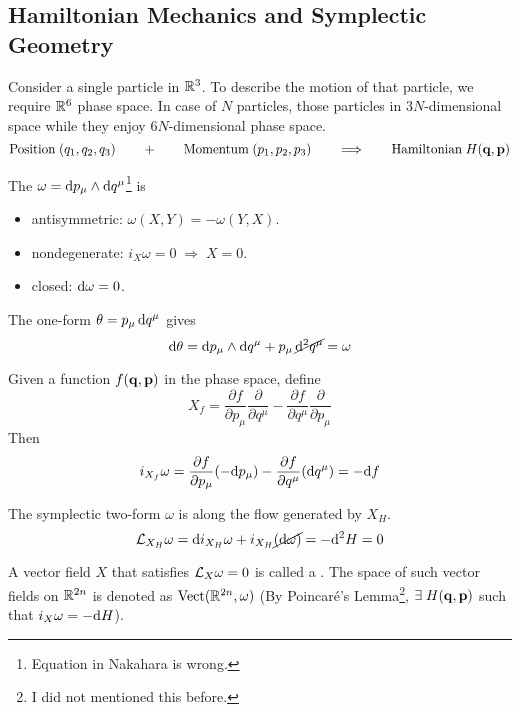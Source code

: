 \documentclass[a4paper, 10pt]{article}
\begin{document}
\subsection{Hamiltonian Mechanics and Symplectic Geometry}

Consider a single particle in $\mathbb{R}^{3}$. To describe the motion of that particle, we require $\mathbb{R}^{6}$ phase space. In case of $N$ particles, those particles  in $3N$-dimensional space while they enjoy $6N$-dimensional phase space. 
\[ \text{Position} \; (q_{1}, q_{2}, q_{3}) \qquad + \qquad \text{Momentum} \; (p_{1}, p_{2}, p_{3}) \qquad \Longrightarrow \qquad \text{Hamiltonian} \; H(\mathbf{q}, \mathbf{p}) \]
\begin{definition}
    The  $\omega = \mathrm{d}{p}_{\mu} \wedge \mathrm{d}{q}^{\mu}$\footnote{Equation in Nakahara is wrong.} is
    \begin{itemize}
        \item antisymmetric: $\omega(X,Y) = -\omega(Y,X)$.
        \item nondegenerate: $i_{X}\omega = 0 \; \Longrightarrow \; X = 0$.
        \item closed: $\mathrm{d}\omega = 0$.
    \end{itemize}
\end{definition}
\begin{remark}
    The one-form $\theta = p_{\mu}\,\mathrm{d}{q}^{\mu}$ gives
    \[ \mathrm{d}\theta = \mathrm{d}{p}_{\mu} \wedge \mathrm{d}{q}^{\mu} + p_{\mu}\,\cancel{\mathrm{d}^{2}q^{\mu}} = \omega \]
\end{remark}
\newpage


\begin{definition}
    Given a function $f(\mathbf{q}, \mathbf{p})$ in the phase space, define
    \[ X_{f} = \frac{\partial{f}}{\partial{p}_{\mu}}\frac{\partial}{\partial{q}^{\mu}} - \frac{\partial{f}}{\partial{q}^{\mu}}\frac{\partial}{\partial{p}_{\mu}} \]
    Then
    \[ i_{X_{f}}\omega = \frac{\partial{f}}{\partial{p}_{\mu}}(-\mathrm{d}{p}_{\mu}) - \frac{\partial{f}}{\partial{q}^{\mu}}(\mathrm{d}{q}^{\mu}) = -\mathrm{d}{f} \]
\end{definition}
\begin{remark}
    The symplectic two-form $\omega$ is  along the flow generated by $X_{H}$.
    \[ \mathcal{L}_{X_{H}}\omega = \mathrm{d} i_{X_{H}}\omega + i_{X_{H}}\cancel{(\mathrm{d}\omega)} = -\mathrm{d}^{2}H = 0 \]
\end{remark}
\begin{remark}
    A vector field $X$ that satisfies $\mathcal{L}_{X}\omega = 0$ is called a . The space of such vector fields on $\mathbb{R}^{2n}$ is denoted as $\mathrm{Vect}(\mathbb{R}^{2n},\omega)$ (By Poincar\'e's Lemma\footnote{I did not mentioned this before.}, $\exists \; H(\mathbf{q},\mathbf{p})$ such that $i_{X}\omega = -\mathrm{d}{H}$).
\end{remark}
\end{document}
